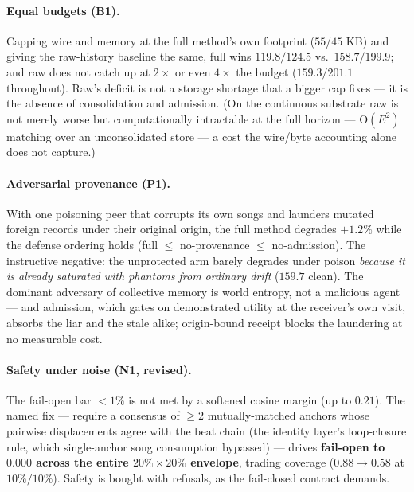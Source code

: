 \documentclass{article}
\begin{document}
\paragraph{Equal budgets (B1).} Capping wire and memory at the full
method's own footprint ($55$/$45$ KB) and giving the raw-history
baseline the same, full wins $119.8/124.5$ vs.\ $158.7/199.9$; and
raw does not catch up at $2\times$ or even $4\times$ the budget
($159.3/201.1$ throughout). Raw's deficit is not a storage shortage
that a bigger cap fixes --- it is the absence of consolidation and
admission. (On the continuous substrate raw is not merely worse but
computationally intractable at the full horizon --- $\mathrm{O}(E^2)$
matching over an unconsolidated store --- a cost the wire/byte
accounting alone does not capture.)

\paragraph{Adversarial provenance (P1).} With one poisoning peer that
corrupts its own songs and launders mutated foreign records under
their original origin, the full method degrades $+1.2\%$ while the
defense ordering holds (full $\le$ no-provenance $\le$ no-admission).
The instructive negative: the unprotected arm barely degrades under
poison \emph{because it is already saturated with phantoms from
ordinary drift} ($159.7$ clean). The dominant adversary of collective
memory is world entropy, not a malicious agent --- and admission,
which gates on demonstrated utility at the receiver's own visit,
absorbs the liar and the stale alike; origin-bound receipt blocks the
laundering at no measurable cost.

\paragraph{Safety under noise (N1, revised).} The fail-open bar
$<1\%$ is not met by a softened cosine margin (up to $0.21$). The
named fix --- require a consensus of $\ge 2$ mutually-matched anchors
whose pairwise displacements agree with the beat chain (the identity
layer's loop-closure rule, which single-anchor song consumption
bypassed) --- drives \textbf{fail-open to $0.000$ across the entire
$20\%{\times}20\%$ envelope}, trading coverage ($0.88 \to 0.58$ at
$10\%/10\%$). Safety is bought with refusals, as the fail-closed
contract demands.
\end{document}
